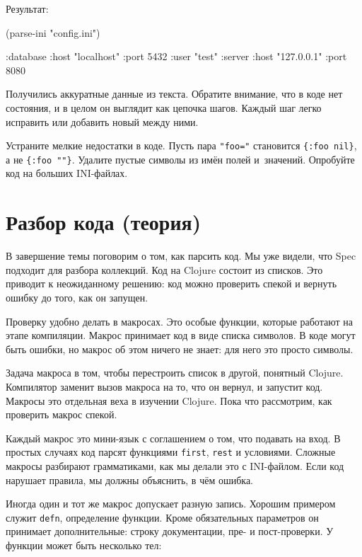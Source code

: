 \noindent
Результат:

\begin{english}
  \begin{clojure}
(parse-ini "config.ini")

{:database {:host "localhost"
            :port 5432
            :user "test"}
 :server {:host "127.0.0.1"
          :port 8080}}
  \end{clojure}
\end{english}

Получились аккуратные данные из текста. Обратите внимание, что в коде нет
состояния, и в целом он выглядит как цепочка шагов. Каждый шаг легко исправить
или добавить новый между ними.

Устраните мелкие недостатки в коде. Пусть пара \verb|"foo="| становится
\verb|{:foo nil}|, а не \verb|{:foo ""}|.  Удалите пустые символы из
имён полей и~значений. Опробуйте код на больших INI-файлах.

\section{Разбор кода (теория)}


В завершение темы поговорим о том, как парсить код. Мы уже видели, что Spec
подходит для разбора коллекций. Код на Clojure состоит из списков. Это приводит
к неожиданному решению: код можно проверить спекой и вернуть ошибку до того, как
он запущен.

Проверку удобно делать в макросах. Это особые функции, которые работают на этапе
компиляции. Макрос принимает код в виде списка символов. В коде могут быть
ошибки, но макрос об этом ничего не знает: для него это просто символы.

Задача макроса в том, чтобы перестроить список в другой, понятный
Clojure. Компилятор заменит вызов макроса на то, что он вернул, и запустит
код. Макросы это отдельная веха в изучении Clojure. Пока что рассмотрим, как
проверить макрос спекой.

Каждый макрос это мини-язык с соглашением о том, что подавать на вход. В простых
случаях код парсят функциями \verb|first|, \verb|rest| и условиями. Сложные
макросы разбирают грамматиками, как мы делали это с INI-файлом. Если код
нарушает правила, мы должны объяснить, в чём ошибка.

Иногда один и тот же макрос допускает разную запись. Хорошим примером служит
\verb|defn|, определение функции. Кроме обязательных параметров он принимает
дополнительные: строку документации, пре- и пост-проверки. У функции может быть
несколько тел:

